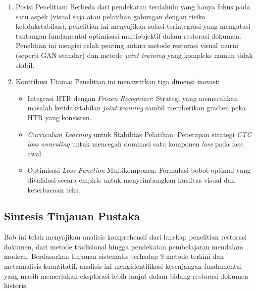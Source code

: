 \documentclass[12pt,a4paper]{article}
\begin{document}
\begin{enumerate}[leftmargin=1.5em, labelsep=0.5em, itemindent=0pt, label=\arabic*., topsep=0pt, parsep=0pt, itemsep=0.5em]
      \item Posisi Penelitian: Berbeda dari pendekatan terdahulu yang hanya fokus pada satu aspek (visual saja atau pelatihan gabungan dengan risiko ketidakstabilan), penelitian ini menyajikan solusi terintegrasi yang mengatasi tantangan fundamental optimisasi multiobjektif dalam restorasi dokumen. Penelitian ini mengisi celah penting antara metode restorasi visual murni (seperti GAN standar) dan metode \textit{joint training} yang kompleks namun tidak stabil.

      \item Kontribusi Utama: Penelitian ini menawarkan tiga dimensi inovasi:
            \begin{itemize}[leftmargin=1.5em, labelsep=0.5em, topsep=0pt, parsep=0pt, itemsep=0.2em]
                  \item Integrasi HTR dengan \textit{Frozen Recognizer}: Strategi yang memecahkan masalah ketidakstabilan \textit{joint training} sambil memberikan gradien peka HTR yang konsisten.
                  \item \textit{Curriculum Learning} untuk Stabilitas Pelatihan: Penerapan strategi \textit{CTC loss annealing} untuk mencegah dominasi satu komponen \textit{loss} pada fase awal.
                  \item Optimisasi \textit{Loss Function} Multikomponen: Formulasi bobot optimal yang divalidasi secara empiris untuk menyeimbangkan kualitas visual dan keterbacaan teks.
            \end{itemize}
\end{enumerate}


\subsection{Sintesis Tinjauan Pustaka}
\label{subsec:tinjauan-summary}

Bab ini telah menyajikan analisis komprehensif dari lanskap penelitian restorasi dokumen, dari metode tradisional hingga pendekatan pembelajaran mendalam modern. Berdasarkan tinjauan sistematis terhadap 9 metode terkini dan metaanalisis kuantitatif, analisis ini mengidentifikasi kesenjangan fundamental yang masih memerlukan eksplorasi lebih lanjut dalam bidang restorasi dokumen historis.
\end{document}
